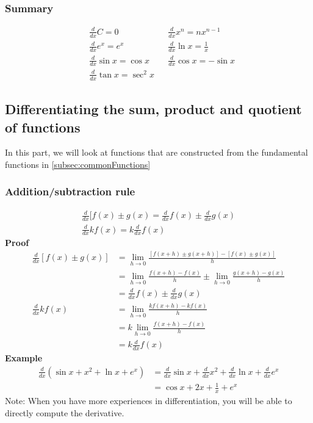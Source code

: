 \documentclass{article}
\begin{document}
\subsubsection{Summary}
\begin{equation*}
\begin{aligned}
    &\frac{d}{dx} C =0 &   &\frac{d}{dx} x^{n} =nx^{n-1}\\
    &\frac{d}{dx} e^{x} =e^{x} &  &\frac{d}{dx}\ln x =\frac{1}{x}\\
    &\frac{d}{dx}\sin x =\cos x &  &\frac{d}{dx}\cos x =-\sin x\\
    &\frac{d}{dx}\tan x =\sec^{2} x
\end{aligned}
\end{equation*}
\subsection{Differentiating the sum, product and quotient of functions}
In this part, we will look at functions that are constructed from the fundamental functions in \ref{subsec:commonFunctions}
\subsubsection{Addition/subtraction rule}
\begin{gather*}
    \frac{d}{dx}[ f( x) \pm g( x) =\frac{d}{dx} f( x) \pm \frac{d}{dx} g( x)\\
    \frac{d}{dx} kf( x) =k\frac{d}{dx} f( x)
\end{gather*}
\textbf{Proof}
\begin{equation*}
\begin{aligned}
    \frac{d}{dx}[ f( x) \pm g( x)] & =\lim _{h\rightarrow 0}\frac{[ f( x+h) \pm g( x+h)] -[ f( x) \pm g( x)]}{h}\\
        & =\lim _{h\rightarrow 0}\frac{f( x+h) -f( x)}{h} \pm \lim _{h\rightarrow 0}\frac{g( x+h) -g( x)}{h}\\
        & =\frac{d}{dx} f( x) \pm \frac{d}{dx} g( x)\\
    \frac{d}{dx} kf( x) & =\lim _{h\rightarrow 0}\frac{kf( x+h) -kf( x)}{h}\\
        & =k\lim _{h\rightarrow 0}\frac{f( x+h) -f( x)}{h}\\
        & =k\frac{d}{dx} f( x)
\end{aligned}
\end{equation*}
\textbf{Example}
\begin{equation*}
\begin{aligned}
    \frac{d}{dx}\left(\sin x+x^{2} +\ln x+e^{x}\right) & =\frac{d}{dx}\sin x+\frac{d}{dx} x^{2} +\frac{d}{dx}\ln x+\frac{d}{dx} e^{x}\\
    & =\cos x+2x+\frac{1}{x} +e^{x}
\end{aligned}
\end{equation*}
Note: When you have more experiences
in differentiation, you will be able to
directly compute the derivative.
\end{document}

